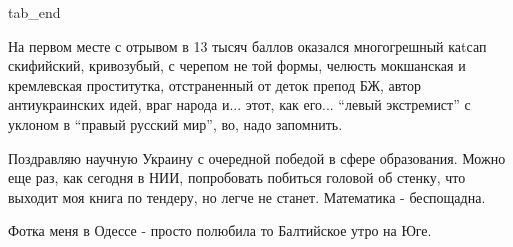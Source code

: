   tab_end
\fi

На первом месте с отрывом в 13 тысяч баллов оказался многогрешный каtсап
скифийский, кривозубый, с черепом не той формы, челюсть мокшанская и
кремлевская проститутка, отстраненный от деток препод БЖ, автор антиукраинских
идей, враг народа и... этот, как его... \enquote{левый экстремист} с уклоном в
\enquote{правый русский мир}, во, надо запомнить.

Поздравляю научную Украину с очередной победой в сфере образования. Можно еще
раз, как сегодня в НИИ, попробовать побиться головой об стенку, что выходит моя
книга по тендеру, но легче не станет. Математика - беспощадна.

Фотка меня в Одессе - просто полюбила то Балтийское утро на Юге.
